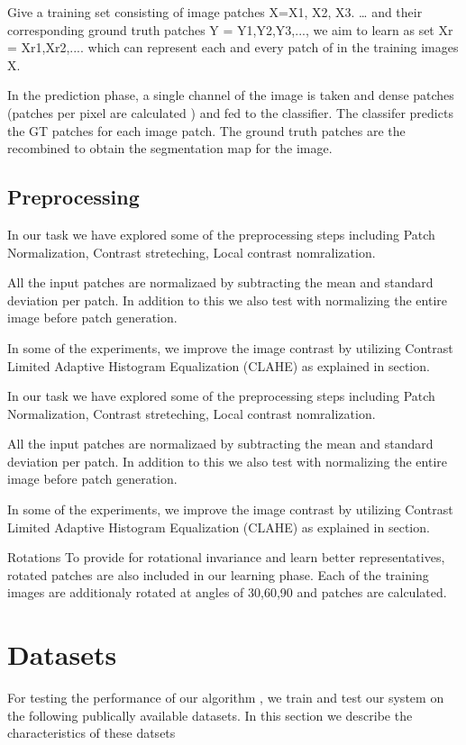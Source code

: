 Give a training set consisting of image patches X={X1, X2, X3. … } and their corresponding ground truth patches Y = {Y1,Y2,Y3,...}, we aim to learn as set Xr = {Xr1,Xr2,.... } which can represent each and every patch of in the training images X.

In the prediction phase, a single channel of the image is taken and dense patches (patches per pixel are calculated ) and fed to the classifier. The classifer predicts the GT patches for each image patch. The ground truth patches are the recombined to obtain the segmentation map for the image.

\subsection{Preprocessing}
In our task we have explored some of the preprocessing steps including Patch Normalization, Contrast streteching, Local contrast nomralization.

All the input patches are normalizaed by subtracting the mean and standard deviation per patch. In addition to this we also test with normalizing the entire image before patch generation.

In some of the experiments, we improve the image contrast by utilizing Contrast Limited Adaptive Histogram Equalization (CLAHE) as explained in section{}.

In our task we have explored some of the preprocessing steps including Patch Normalization, Contrast streteching, Local contrast nomralization.

All the input patches are normalizaed by subtracting the mean and standard deviation per patch. In addition to this we also test with normalizing the entire image before patch generation.

In some of the experiments, we improve the image contrast by utilizing Contrast Limited Adaptive Histogram Equalization (CLAHE) as explained in section{}.

Rotations
To provide for rotational invariance and learn better representatives, rotated patches are also included in our learning phase. Each of the training images are additionaly rotated at angles of 30,60,90 and patches are calculated.

\section{Datasets}
For testing the performance of our algorithm , we train and test our system on the following publically available datasets. In this section we describe the characteristics of these datsets

